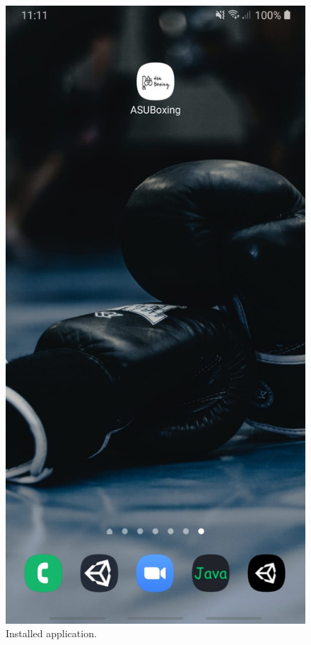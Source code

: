 \documentclass[a4paper,12pt]{report}
\begin{document}
 \begin{figure}[ht] 
  \label{ fig7} 
  \begin{minipage}[b]{0.5\linewidth}
    \centering
    \includegraphics[width=.7\linewidth]{images/aplicationImages/application.jpeg} 
    \caption{Installed application.} 
    \vspace{4ex}
  \end{minipage}%
  \begin{minipage}[b]{0.5\linewidth}
    \centering

\end{minipage}
\end{figure}
\end{document}
